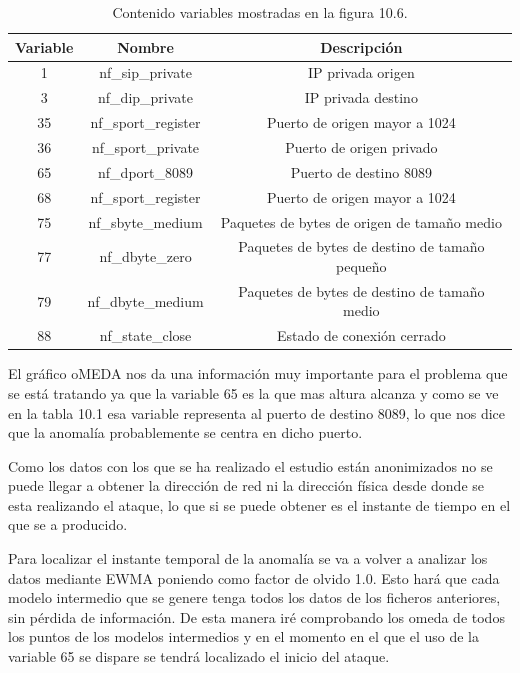 \bigskip

\begin{table}[H]
\begin{center}
\begin{tabular}{|c|c|c|}
\hline
\textbf{Variable} &\textbf{Nombre} & \textbf{Descripción} \\
 \hline \hline

1 & nf\_sip\_private & IP privada origen\\ \hline
3 & nf\_dip\_private & IP privada destino\\ \hline
35 & nf\_sport\_register & Puerto de origen mayor a 1024 \\ \hline
36 & nf\_sport\_private & Puerto de origen privado \\ \hline
65 & nf\_dport\_8089 & Puerto de destino 8089 \\ \hline
68 & nf\_sport\_register & Puerto de origen mayor a 1024 \\ \hline
75 & nf\_sbyte\_medium & Paquetes de bytes de origen de tamaño medio \\ \hline
77 & nf\_dbyte\_zero & Paquetes de bytes de destino de tamaño pequeño\\	\hline
79 & nf\_dbyte\_medium & Paquetes de bytes de destino de tamaño medio \\ \hline
88 & nf\_state\_close & Estado de conexión cerrado \\ \hline

\end{tabular}
\caption{Contenido variables mostradas en la figura 10.6.}
\end{center}
\end{table}

El gráfico oMEDA nos da una información muy importante para el problema que se está tratando ya que la variable 65 es la que mas altura alcanza y como se ve en la tabla 10.1 esa variable representa al puerto de destino 8089, lo que nos dice que la anomalía probablemente se centra en dicho puerto.

\bigskip

Como los datos con los que se ha realizado el estudio están anonimizados no se puede llegar a obtener la dirección de red ni la dirección física desde donde se esta realizando el ataque, lo que si se puede obtener es el instante de tiempo en el que se a producido.

\bigskip

Para localizar el instante temporal de la anomalía se va a volver a analizar los datos mediante EWMA poniendo como factor de olvido 1.0. Esto hará que cada modelo intermedio que se genere tenga todos los datos de los ficheros anteriores, sin pérdida de información. De esta manera iré comprobando los omeda de todos los puntos de los modelos intermedios y en el momento en el que el uso de la variable 65 se dispare se tendrá localizado el inicio del ataque.
\bigskip

